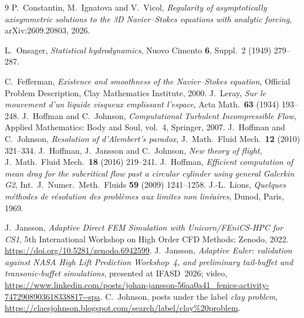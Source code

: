 \documentclass[11pt]{article}
\begin{document}
\begin{thebibliography}{9}
 P.~Constantin, M.~Ignatova and V.~Vicol, \emph{Regularity of asymptotically
axisymmetric solutions to the 3D Navier--Stokes equations with analytic forcing},
arXiv:2609.20803, 2026.

 L.~Onsager, \emph{Statistical hydrodynamics}, Nuovo Cimento \textbf{6},
Suppl.~2 (1949) 279--287.

 C.~Fefferman, \emph{Existence and smoothness of the Navier--Stokes equation},
Official Problem Description, Clay Mathematics Institute, 2000.
 J.~Leray, \emph{Sur le mouvement d'un liquide visqueux emplissant l'espace},
Acta Math.\ \textbf{63} (1934) 193--248.
 J.~Hoffman and C.~Johnson, \emph{Computational Turbulent Incompressible Flow},
Applied Mathematics: Body and Soul, vol.~4, Springer, 2007.
 J.~Hoffman and C.~Johnson, \emph{Resolution of d'Alembert's paradox},
J.\ Math.\ Fluid Mech.\ \textbf{12} (2010) 321--334.
 J.~Hoffman, J.~Jansson and C.~Johnson, \emph{New theory of flight},
J.\ Math.\ Fluid Mech.\ \textbf{18} (2016) 219--241.
 J.~Hoffman, \emph{Efficient computation of mean drag for the subcritical flow past a
circular cylinder using general Galerkin G2}, Int.\ J.\ Numer.\ Meth.\ Fluids \textbf{59} (2009)
1241--1258.
 J.-L.~Lions, \emph{Quelques m\'ethodes de r\'esolution des probl\`emes aux
limites non lin\'eaires}, Dunod, Paris, 1969.

 J.~Jansson, \emph{Adaptive Direct FEM Simulation with Unicorn/FEniCS-HPC for CS1},
  5th International Workshop on High Order CFD Methods; Zenodo, 2022.
  \newblock \url{https://doi.org/10.5281/zenodo.6942599}.
 J.~Jansson, \emph{Adaptive Euler: validation against NASA High Lift Prediction
  Workshop~4, and preliminary tail-buffet and transonic-buffet simulations}, presented at
  IFASD~2026; video,
  \url{https://www.linkedin.com/posts/johan-jansson-56aa0a41_fenics-activity-7472908903618338817--spa}.
 C.~Johnson, posts under the label \emph{clay problem},
\url{https://claesjohnson.blogspot.com/search/label/clay\%20problem}.
\end{thebibliography}
\end{document}
